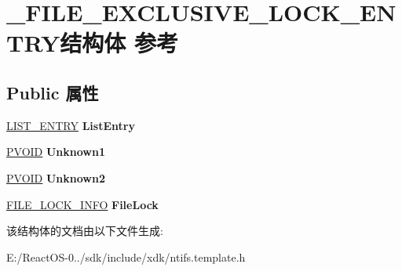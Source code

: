 \hypertarget{struct___f_i_l_e___e_x_c_l_u_s_i_v_e___l_o_c_k___e_n_t_r_y}{}\section{\+\_\+\+F\+I\+L\+E\+\_\+\+E\+X\+C\+L\+U\+S\+I\+V\+E\+\_\+\+L\+O\+C\+K\+\_\+\+E\+N\+T\+R\+Y结构体 参考}
\label{struct___f_i_l_e___e_x_c_l_u_s_i_v_e___l_o_c_k___e_n_t_r_y}
\subsection*{Public 属性}
\begin{DoxyCompactItemize}
\item 
\mbox{\label{struct___f_i_l_e___e_x_c_l_u_s_i_v_e___l_o_c_k___e_n_t_r_y_a9e9cea8892024a0651551680dcb00716}} 
\hyperlink{struct___l_i_s_t___e_n_t_r_y}{L\+I\+S\+T\+\_\+\+E\+N\+T\+RY} {\bfseries List\+Entry}
\item 
\mbox{\label{struct___f_i_l_e___e_x_c_l_u_s_i_v_e___l_o_c_k___e_n_t_r_y_ad355e6bd9fb1bfd54137641ad6549c96}} 
\hyperlink{interfacevoid}{P\+V\+O\+ID} {\bfseries Unknown1}
\item 
\mbox{\label{struct___f_i_l_e___e_x_c_l_u_s_i_v_e___l_o_c_k___e_n_t_r_y_aa599f52c0beb7ea9e35c160ff25478c9}} 
\hyperlink{interfacevoid}{P\+V\+O\+ID} {\bfseries Unknown2}
\item 
\mbox{\label{struct___f_i_l_e___e_x_c_l_u_s_i_v_e___l_o_c_k___e_n_t_r_y_a4bb411a7409d851d4ed0347c5de62bd8}} 
\hyperlink{struct___f_i_l_e___l_o_c_k___i_n_f_o}{F\+I\+L\+E\+\_\+\+L\+O\+C\+K\+\_\+\+I\+N\+FO} {\bfseries File\+Lock}
\end{DoxyCompactItemize}


该结构体的文档由以下文件生成\+:\begin{DoxyCompactItemize}
\item 
E\+:/\+React\+O\+S-\/0../sdk/include/xdk/ntifs.\+template.\+h\end{DoxyCompactItemize}
